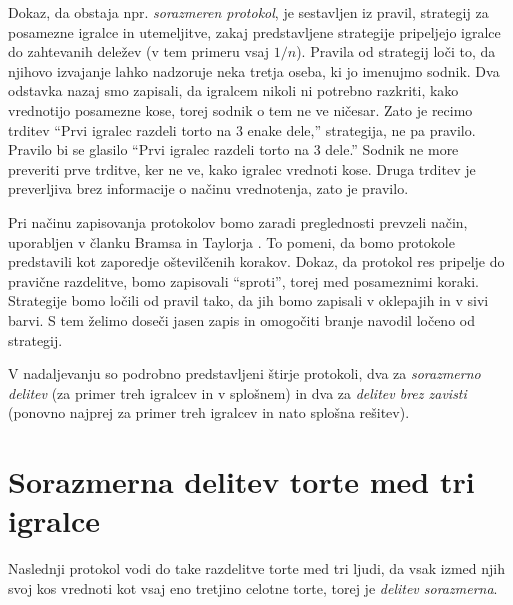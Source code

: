 \documentclass[a4paper,12pt]{article}
\begin{document}
Dokaz, da obstaja npr. {\em sorazmeren protokol}, je sestavljen iz pravil, strategij za posamezne igralce in utemeljitve, zakaj predstavljene strategije pripeljejo igralce do zahtevanih deležev (v tem primeru vsaj $1/n$). Pravila od strategij loči to, da njihovo izvajanje lahko nadzoruje neka tretja oseba, ki jo imenujmo sodnik. Dva odstavka nazaj smo zapisali, da igralcem nikoli ni potrebno razkriti, kako vrednotijo posamezne kose, torej sodnik o tem ne ve ničesar. Zato je recimo trditev ``Prvi igralec razdeli torto na 3 enake dele,'' strategija, ne pa pravilo. Pravilo bi se glasilo ``Prvi igralec razdeli torto na 3 dele.'' Sodnik ne more preveriti prve trditve, ker ne ve, kako igralec vrednoti kose. Druga trditev je preverljiva brez informacije o načinu vrednotenja, zato je pravilo.

Pri načinu zapisovanja protokolov bomo zaradi preglednosti prevzeli način, uporabljen v članku Bramsa in Taylorja \cite{bramstaylor}. To pomeni, da bomo protokole predstavili kot zaporedje oštevilčenih korakov. Dokaz, da protokol res pripelje do pravične razdelitve, bomo zapisovali ``sproti'', torej med posameznimi koraki. Strategije bomo ločili od pravil tako, da jih bomo zapisali v oklepajih in v sivi barvi. S tem želimo doseči jasen zapis in omogočiti branje navodil ločeno od strategij.

V nadaljevanju so podrobno predstavljeni štirje protokoli, dva za {\em sorazmerno delitev} (za primer treh igralcev in v splošnem) in dva za {\em delitev brez zavisti} (ponovno najprej za primer treh igralcev in nato splošna rešitev).


\section{Sorazmerna delitev torte med tri igralce}

Naslednji protokol vodi do take razdelitve torte med tri ljudi, da vsak izmed njih svoj kos vrednoti kot vsaj eno tretjino celotne torte, torej je {\em delitev sorazmerna}.
\end{document}
